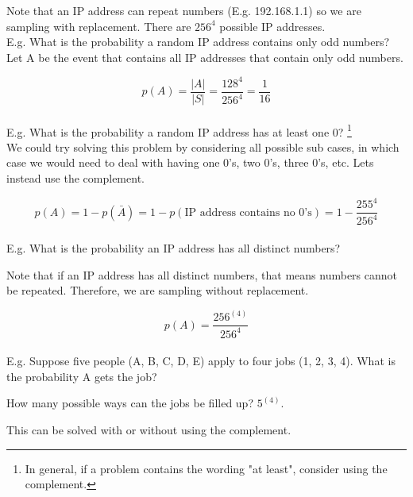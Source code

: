 \documentclass[12pt, letterpaper]{article}
\begin{document}
Note that an IP address can repeat numbers (E.g. 192.168.1.1) so we are sampling with replacement.
There are \(256^4\) possible IP addresses.\\

E.g. What is the probability a random IP address contains only odd numbers?\\

Let A be the event that contains all IP addresses that contain only odd numbers.

\[
	p\left(A\right) = \frac{|A|}{|S|} = \frac{128^4}{256^4} = \frac{1}{16}
\]\\

E.g. What is the probability a random IP address has at least one 0? \footnote{In general, if a problem contains the wording "at least", consider using the complement.} \\

We could try solving this problem by considering all possible sub cases, in which case we would need to deal with having one 0's, two 0's, three 0's, etc. Lets instead use the complement.

\[
	p\left(A\right) = 1 - p\left(\bar{A}\right) = 1 - p\left(\text{IP address contains no 0's}\right) = 1 - \frac{255^4}{256^4}
\]\\

E.g. What is the probability an IP address has all distinct numbers?

Note that if an IP address has all distinct numbers, that means numbers cannot be repeated. Therefore, we are sampling without replacement.

\[
	p\left(A\right) = \frac{256^{(4)}}{256^4}
\]\\

E.g. Suppose five people (A, B, C, D, E) apply to four jobs (1, 2, 3, 4). What is the probability A gets the job?

How many possible ways can the jobs be filled up? \(5^{(4)}\).

This can be solved with or without using the complement. \\
\end{document}
